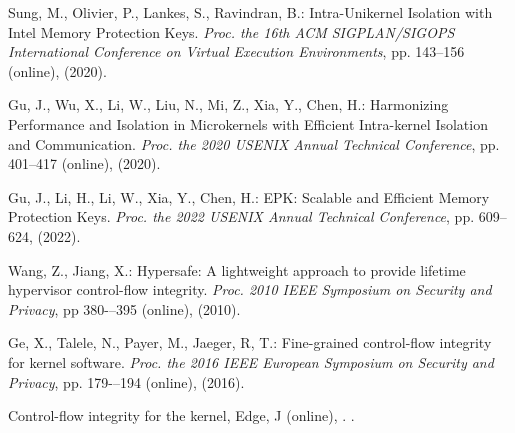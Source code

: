 \documentclass[english,sigrecommended,JIP]{ipsj}
\begin{document}
\begin{thebibliography}{99}
  Sung, M., Olivier, P., Lankes, S., Ravindran, B.: Intra-Unikernel Isolation with Intel Memory Protection Keys.
  \textit{Proc. the 16th ACM SIGPLAN/SIGOPS International Conference on Virtual Execution Environments}, pp. 143--156 (online),  (2020).

  Gu, J., Wu, X., Li, W., Liu, N., Mi, Z., Xia, Y., Chen, H.: Harmonizing Performance and Isolation in Microkernels with Efficient Intra-kernel Isolation and Communication.
  \textit{Proc. the 2020 USENIX Annual Technical Conference}, pp. 401--417 (online),  (2020).
  
  Gu, J., Li, H., Li, W., Xia, Y., Chen, H.: EPK: Scalable and Efficient Memory Protection Keys.
  \textit{Proc. the 2022 USENIX Annual Technical Conference}, pp. 609--624, (2022).
  
  Wang, Z., Jiang, X.: Hypersafe: A lightweight approach to provide lifetime hypervisor control-flow integrity. 
  \textit{Proc. 2010 IEEE Symposium on Security and Privacy}, pp 380-–395 (online),  (2010).

  Ge, X., Talele, N., Payer, M., Jaeger, R, T.: Fine-grained control-flow integrity for kernel software. 
  \textit{Proc. the 2016 IEEE European Symposium on Security and Privacy}, pp. 179-–194 (online),  (2016).

  Control-flow integrity for the kernel, Edge, J (online), . .


\end{thebibliography}
\end{document}
